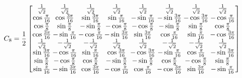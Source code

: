 \documentclass[a4paper,12pt,openright]{book}
\begin{document}
\begin{gather*}
 C_8 = \frac{1}{2}
  \setlength{\arraycolsep}{1pt}
  \renewcommand{\arraystretch}{1}
  \begin{bmatrix}
  \frac{1}{\sqrt{2}} & \frac{1}{\sqrt{2}} & \frac{1}{\sqrt{2}} & \frac{1}{\sqrt{2}} & \frac{1}{\sqrt{2}} & \frac{1}{\sqrt{2}} & \frac{1}{\sqrt{2}} & \frac{1}{\sqrt{2}}\\
  \cos{\frac{\pi}{16}} & \cos{\frac{3\pi}{16}} & \sin{\frac{3\pi}{16}} & \sin{\frac{\pi}{16}} & -\sin{\frac{\pi}{16}} & -\sin{\frac{3\pi}{16}} & -\cos{\frac{3\pi}{16}} & -\cos{\frac{\pi}{16}}\\
  \cos{\frac{\pi}{8}} & \sin{\frac{\pi}{8}} & -\sin{\frac{\pi}{8}} & -\cos{\frac{\pi}{8}} & -\cos{\frac{\pi}{8}} & -\sin{\frac{\pi}{8}} & \sin{\frac{\pi}{8}} & \cos{\frac{\pi}{8}} \\
  \cos{\frac{3\pi}{16}} & -\sin{\frac{\pi}{16}} & -\cos{\frac{\pi}{16}} & -\sin{\frac{3\pi}{16}} & \sin{\frac{3\pi}{16}} & \cos{\frac{\pi}{16}} & \sin{\frac{\pi}{16}} & -\cos{\frac{3\pi}{16}}\\
  \frac{1}{\sqrt{2}} & -\frac{1}{\sqrt{2}} & -\frac{1}{\sqrt{2}} & \frac{1}{\sqrt{2}} & \frac{1}{\sqrt{2}} & -\frac{1}{\sqrt{2}} & -\frac{1}{\sqrt{2}} & \frac{1}{\sqrt{2}}\\
  \sin{\frac{3\pi}{16}} & -\cos{\frac{\pi}{16}} & \sin{\frac{\pi}{16}} & \cos{\frac{3\pi}{16}} & -\cos{\frac{3\pi}{16}} & -\sin{\frac{\pi}{16}} & \cos{\frac{\pi}{16}} & -\sin{\frac{3\pi}{16}}\\
  \sin{\frac{\pi}{8}} & -\cos{\frac{\pi}{8}} & \cos{\frac{\pi}{8}} & -\sin{\frac{\pi}{8}} & -\sin{\frac{\pi}{8}} & \cos{\frac{\pi}{8}} & -\cos{\frac{\pi}{8}} & \sin{\frac{\pi}{8}} \\
  \sin{\frac{\pi}{16}} & -\sin{\frac{3\pi}{16}} & \cos{\frac{3\pi}{16}} & -\cos{\frac{\pi}{16}} & \cos{\frac{\pi}{16}} & -\cos{\frac{3\pi}{16}} & \sin{\frac{3\pi}{16}} & -\sin{\frac{\pi}{16}}\\
   \end{bmatrix}
\end{gather*}
\end{document}

